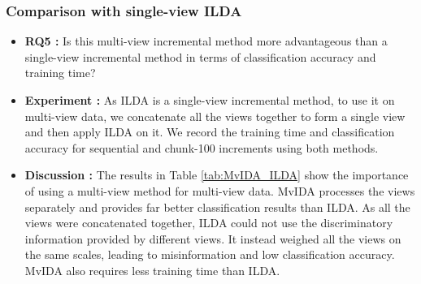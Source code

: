 \subsubsection{Comparison with single-view ILDA}
\label{ssubs:MvIDA_ILDA}
\begin{itemize}
\item \textbf{RQ5 :} 
Is this multi-view incremental method more advantageous than a single-view incremental method in terms of classification accuracy and training time?

\item \textbf{Experiment :}
As ILDA is a single-view incremental method, to use it on multi-view data, we concatenate all the views together to form a single view and then apply ILDA on it. We record the training time and classification accuracy for sequential and chunk-100 increments using both methods.

\item \textbf{Discussion :}
The results in Table \ref{tab:MvIDA_ILDA} show the importance of using a multi-view method for multi-view data. MvIDA processes the views separately and provides far better classification results than ILDA. As all the views were concatenated together, ILDA could not use the discriminatory information provided by different views. It instead weighed all the views on the same scales, leading to misinformation and low classification accuracy. MvIDA also requires less training time than ILDA.
\end{itemize}

